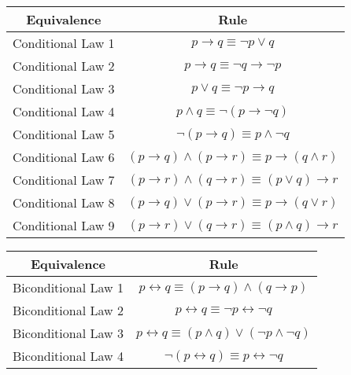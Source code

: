 \documentclass{exam}
\begin{document}
\begin{center}
\begin{tabular}{|c|c|}
  \hline
  Equivalence & Rule \\
  \hline
  Conditional Law 1 & $p \rightarrow q \equiv \lnot p \lor q$ \\
  Conditional Law 2 & $p \rightarrow q \equiv \lnot q \rightarrow \lnot p$ \\
  Conditional Law 3 & $p \lor q \equiv \lnot p \rightarrow q$ \\
  Conditional Law 4 & $p \land q \equiv \lnot (p \rightarrow \lnot q)$ \\
  Conditional Law 5 & $\lnot (p \rightarrow q) \equiv p \land \lnot q$ \\
  Conditional Law 6 & $(p \rightarrow q) \land (p \rightarrow r) \equiv p \rightarrow (q \land r)$ \\
  Conditional Law 7 & $(p \rightarrow r) \land (q \rightarrow r) \equiv (p \lor q) \rightarrow r$ \\
  Conditional Law 8 & $(p \rightarrow q) \lor (p \rightarrow r) \equiv p \rightarrow (q \lor r)$ \\
  Conditional Law 9 & $(p \rightarrow r) \lor (q \rightarrow r) \equiv (p \land q) \rightarrow r$ \\
  \hline
\end{tabular}
\end{center}
\vspace{5mm}
\begin{center}
    \begin{tabular}{|c|c|}
  \hline
  Equivalence & Rule \\
  \hline
  Biconditional Law 1 & $p \leftrightarrow q \equiv (p \rightarrow q) \land (q \rightarrow p)$ \\
  Biconditional Law 2 & $p \leftrightarrow q \equiv \lnot p \leftrightarrow \lnot q$ \\
  Biconditional Law 3 & $p \leftrightarrow q \equiv (p \land q) \lor (\lnot p \land \lnot q)$ \\
  Biconditional Law 4 & $\lnot (p \leftrightarrow q) \equiv p \leftrightarrow \lnot q$ \\
  \hline
\end{tabular}

\end{center}
\end{document}
